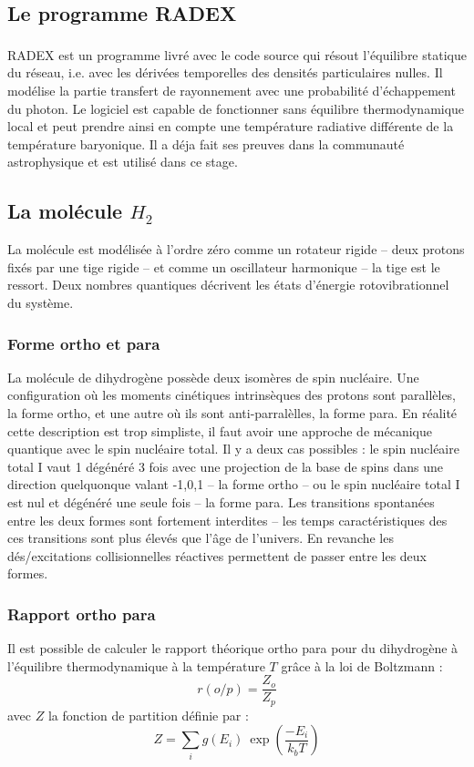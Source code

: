 \documentclass[10pt, a4paper]{report}
\numberwithin{equation}{subsection}
\begin{document}
\subsection{Le programme RADEX}
RADEX\textsuperscript{\cite{RADEX}} est un programme livré avec le code source qui résout l'équilibre statique du réseau, i.e. avec les dérivées temporelles des densités particulaires nulles. Il modélise la partie transfert de rayonnement avec une probabilité d'échappement du photon. Le logiciel est capable de fonctionner sans équilibre thermodynamique local et peut prendre ainsi en compte une température radiative différente de la température baryonique. Il a déja fait ses preuves dans la communauté astrophysique et est utilisé dans ce stage.
\subsection{La molécule $H_2$}
La molécule est modélisée à l'ordre zéro comme un rotateur rigide -- deux protons fixés par une tige rigide -- et comme un oscillateur harmonique -- la tige est le ressort. Deux nombres quantiques décrivent les états d'énergie rotovibrationnel du système.  
\subsubsection{Forme ortho et para}
La molécule de dihydrogène possède deux isomères de spin nucléaire. Une configuration où les moments cinétiques intrinsèques des protons sont parallèles, la forme ortho, et une autre où ils sont anti-parralèlles, la forme para. En réalité cette description est trop simpliste, il faut avoir une approche de mécanique quantique avec le spin nucléaire total. Il y a deux cas possibles : le spin nucléaire total I vaut 1 dégénéré 3 fois avec une projection de la base de spins dans une direction quelquonque valant {-1,0,1} -- la forme ortho -- ou le spin nucléaire total I est nul et dégénéré une seule fois -- la forme para. Les transitions spontanées entre les deux formes sont fortement interdites -- les temps caractéristiques des ces transitions sont plus élevés que l'âge de l'univers. En revanche les dés/excitations collisionnelles réactives permettent de passer entre les deux formes. 
\subsubsection{Rapport ortho para}
Il est possible de calculer le rapport théorique ortho para pour du dihydrogène à l'équilibre thermodynamique à la température $T$ grâce à la loi de Boltzmann :
\begin{equation} \label{eq:EROP}
\boxed{r(o/p) = \frac{Z_o}{Z_p}}
\end{equation}
avec $Z$ la fonction de partition définie par :
\begin{equation} \label{eq:EZ}
 \boxed{Z = \sum\limits_i g(E_i) \ \exp\left(\frac{-E_i}{k_bT}\right)}
\end{equation}
 
\end{document}
